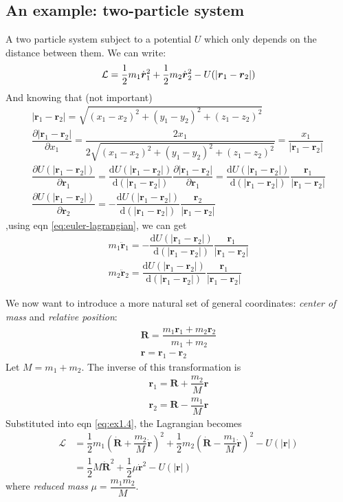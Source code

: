 \documentclass[
  10pt,
  twoside,
  openany,
  b5paper, %
  colorscheme = bootstrap-v4, %
]{qyxf-book}
\newcommand{\der}[2]{\dfrac{\md #1}{\md #2}}
\newcommand{\p}[2]{\dfrac{\partial #1}{\partial #2}}
\newcommand{\md}{\mathrm{d}}
\newcommand{\vr}{\boldsymbol{r}}
\newcommand{\dvr}{\dot{\vr}}
\newcommand{\ddvr}{\ddot{\vr}}
\newcommand{\half}{\dfrac{1}{2}}
\newcommand{\lag}{\mathcal{L}} %
\begin{document}
\subsection{An example: two-particle system}
A two particle system subject to a potential $U$ which only depends on the distance between them. We can write:
\begin{equation}
	\lag=\half m_1\dvr_1^2+\half m_2\dvr_2^2-U(|\vr_1-\vr_2|) \label{eq:ex1.4}\\
\end{equation}
And knowing that (not important)
\begin{gather*}
	|\vr_1-\vr_2|=\sqrt{(x_1-x_2)^2+(y_1-y_2)^2+(z_1-z_2)^2}\\
	\p{|\vr_1-\vr_2|}{x_1}=\dfrac{2x_1}{2\sqrt{(x_1-x_2)^2+(y_1-y_2)^2+(z_1-z_2)^2}}=\dfrac{x_1}{|\vr_1-\vr_2|}\\
	\p{U(|\vr_1-\vr_2|)}{\vr_1}=\der{U(|\vr_1-\vr_2|)}{(|\vr_1-\vr_2|)}\p{|\vr_1-\vr_2|}{\vr_1}=\der{U(|\vr_1-\vr_2|)}{(|\vr_1-\vr_2|)}\dfrac{\vr_1}{|\vr_1-\vr_2|}\\
	\p{U(|\vr_1-\vr_2|)}{\vr_2}=-\der{U(|\vr_1-\vr_2|)}{(|\vr_1-\vr_2|)}\dfrac{\vr_2}{|\vr_1-\vr_2|}
\end{gather*}
,using eqn \ref{eq:euler-lagrangian}, we can get
\begin{gather*}
	m_1\ddvr_1=-\der{U(|\vr_1-\vr_2|)}{(|\vr_1-\vr_2|)}\dfrac{\vr_1}{|\vr_1-\vr_2|}\\
	m_2\ddvr_2=\der{U(|\vr_1-\vr_2|)}{(|\vr_1-\vr_2|)}\dfrac{\vr_1}{|\vr_1-\vr_2|}
\end{gather*}

We now want to introduce a more natural set of general coordinates: \textit{center of mass} and \textit{relative position}:
\begin{gather*}
	\boldsymbol{R}=\dfrac{m_1\vr_1+m_2\vr_2}{m_1+m_2}\\
	\vr=\vr_1-\vr_2
\end{gather*}
Let $M=m_1+m_2$. The inverse of this transformation is
\begin{gather*}
	\vr_1=\boldsymbol{R}+\dfrac{m_2}{M}\vr\\
	\vr_2=\boldsymbol{R}-\dfrac{m_1}{M}\vr
\end{gather*}
Substituted into eqn \ref{eq:ex1.4}, the Lagrangian becomes
\begin{align*}
	\lag&=
	\half 
	m_1\left(\dot{\boldsymbol{R}}+\dfrac{m_2}{M}\dvr\right)^2+
	\half m_2\left(\dot{\boldsymbol{R}}-\dfrac{m_1}{M}\dvr\right)^2-U(|\vr|)\\
	&=\half M\dot{\boldsymbol{R}}^2+\half\mu\dvr^2-U(|\vr|)
\end{align*}
where \textit{reduced mass} $\mu=\dfrac{m_1m_2}{M}$.
\end{document}
